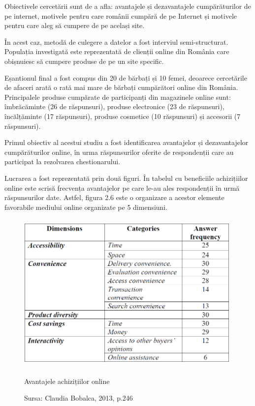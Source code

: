 \documentclass[a4paper, 12pt]{article}
\begin{document}
		\quad Obiectivele cercetării sunt de a afla: avantajele și dezavantajele cumpărăturilor de pe internet, motivele pentru care românii cumpără de pe Internet și motivele pentru care aleg să cumpere de pe același site.
		
		\quad În acest caz, metodă de culegere a datelor a fost interviul semi-structurat. Populația investigată este reprezentată de clienții online din România care obișnuiesc să cumpere produse de pe un site specific. 
		
		\quad Eșantionul final a fost compus din 20 de bărbați și 10 femei, deoarece cercetările de afaceri arată o rată mai mare de bărbați cumpărători online din România. Principalele produse cumpărate de participanți din magazinele online sunt: îmbrăcăminte (26 de răspunsuri), produse electronice (23 de răspunsuri), încălțăminte (17 răspunsuri), produse cosmetice (10 răspunsuri) și accesorii (7 răspunsuri).
		
		\quad Primul obiectiv al acestui studiu a fost identificarea avantajelor și dezavantajelor cumpărăturilor online, în urma răspunsurilor oferite de respondenții care au participat la rezolvarea chestionarului.
		
		 \quad 	Lucrarea a fost reprezentată prin două figuri. În tabelul cu beneficiile achizițiilor online este scrisă frecvența avantajelor pe care le-au ales respondenții în urmă răspunsurilor date. Astfel, figura 2.6 este o organizare a acestor elemente favorabile mediului online organizate pe 5 dimensiuni.
		 
		  
		\begin{figure}[!htb]
			\centering
			\includegraphics[width=11cm, height=8cm]{"figures/zece.png"}
			\caption{Avantajele achizițiilor online}\label{fig:zece}
			\caption*{Sursa: Claudia Bobalca, 2013, p.246}
		\end{figure}
	
\end{document}
